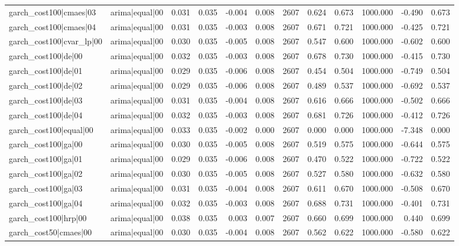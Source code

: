 \begin{table}
\begin{tabular}{llrrrrrrrrrr}
garch\_cost100|cmaes|03 & arima|equal|00 & 0.031 & 0.035 & -0.004 & 0.008 & 2607 & 0.624 & 0.673 & 1000.000 & -0.490 & 0.673 \\
garch\_cost100|cmaes|04 & arima|equal|00 & 0.031 & 0.035 & -0.003 & 0.008 & 2607 & 0.671 & 0.721 & 1000.000 & -0.425 & 0.721 \\
garch\_cost100|cvar\_lp|00 & arima|equal|00 & 0.030 & 0.035 & -0.005 & 0.008 & 2607 & 0.547 & 0.600 & 1000.000 & -0.602 & 0.600 \\
garch\_cost100|de|00 & arima|equal|00 & 0.032 & 0.035 & -0.003 & 0.008 & 2607 & 0.678 & 0.730 & 1000.000 & -0.415 & 0.730 \\
garch\_cost100|de|01 & arima|equal|00 & 0.029 & 0.035 & -0.006 & 0.008 & 2607 & 0.454 & 0.504 & 1000.000 & -0.749 & 0.504 \\
garch\_cost100|de|02 & arima|equal|00 & 0.029 & 0.035 & -0.006 & 0.008 & 2607 & 0.489 & 0.537 & 1000.000 & -0.692 & 0.537 \\
garch\_cost100|de|03 & arima|equal|00 & 0.031 & 0.035 & -0.004 & 0.008 & 2607 & 0.616 & 0.666 & 1000.000 & -0.502 & 0.666 \\
garch\_cost100|de|04 & arima|equal|00 & 0.032 & 0.035 & -0.003 & 0.008 & 2607 & 0.681 & 0.726 & 1000.000 & -0.412 & 0.726 \\
garch\_cost100|equal|00 & arima|equal|00 & 0.033 & 0.035 & -0.002 & 0.000 & 2607 & 0.000 & 0.000 & 1000.000 & -7.348 & 0.000 \\
garch\_cost100|ga|00 & arima|equal|00 & 0.030 & 0.035 & -0.005 & 0.008 & 2607 & 0.519 & 0.575 & 1000.000 & -0.644 & 0.575 \\
garch\_cost100|ga|01 & arima|equal|00 & 0.029 & 0.035 & -0.006 & 0.008 & 2607 & 0.470 & 0.522 & 1000.000 & -0.722 & 0.522 \\
garch\_cost100|ga|02 & arima|equal|00 & 0.030 & 0.035 & -0.005 & 0.008 & 2607 & 0.527 & 0.580 & 1000.000 & -0.632 & 0.580 \\
garch\_cost100|ga|03 & arima|equal|00 & 0.031 & 0.035 & -0.004 & 0.008 & 2607 & 0.611 & 0.670 & 1000.000 & -0.508 & 0.670 \\
garch\_cost100|ga|04 & arima|equal|00 & 0.032 & 0.035 & -0.003 & 0.008 & 2607 & 0.688 & 0.731 & 1000.000 & -0.401 & 0.731 \\
garch\_cost100|hrp|00 & arima|equal|00 & 0.038 & 0.035 & 0.003 & 0.007 & 2607 & 0.660 & 0.699 & 1000.000 & 0.440 & 0.699 \\
garch\_cost50|cmaes|00 & arima|equal|00 & 0.030 & 0.035 & -0.004 & 0.008 & 2607 & 0.562 & 0.622 & 1000.000 & -0.580 & 0.622 \\

\end{tabular}
\end{table}
